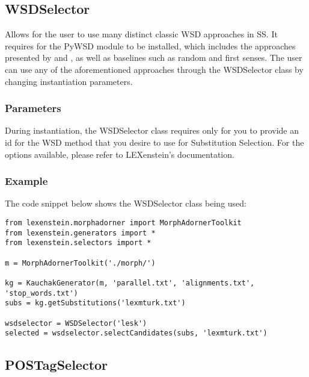 \subsection{WSDSelector}

Allows for the user to use many distinct classic WSD approaches in SS. It requires for the PyWSD \cite{pywsd} module to be installed, which includes the approaches presented by \cite{lesk} and \cite{wupalmer}, as well as baselines such as random and first senses. The user can use any of the aforementioned approaches through the WSDSelector class by changing instantiation parameters.

\subsubsection{Parameters}

During instantiation, the WSDSelector class requires only for you to provide an id for the WSD method that you desire to use for Substitution Selection. For the options available, please refer to LEXenstein's documentation.

\subsubsection{Example}

The code snippet below shows the WSDSelector class being used:

\begin{lstlisting}
from lexenstein.morphadorner import MorphAdornerToolkit
from lexenstein.generators import *
from lexenstein.selectors import *

m = MorphAdornerToolkit('./morph/')

kg = KauchakGenerator(m, 'parallel.txt', 'alignments.txt', 'stop_words.txt')
subs = kg.getSubstitutions('lexmturk.txt')

wsdselector = WSDSelector('lesk')
selected = wsdselector.selectCandidates(subs, 'lexmturk.txt')
\end{lstlisting}
















\subsection{POSTagSelector}


